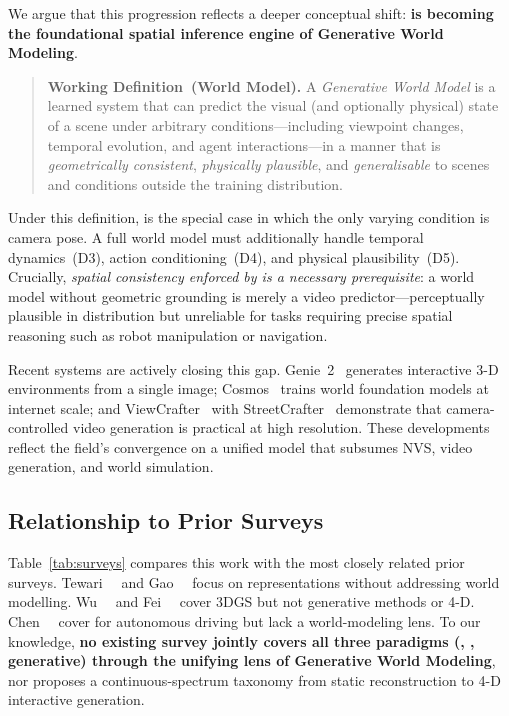 We argue that this progression reflects a deeper conceptual shift:
\textbf{\nvs{} is becoming the foundational spatial inference engine of
Generative World Modeling}.

\begin{quote}
  \textbf{Working Definition~(World Model).}\quad
  A \emph{Generative World Model} is a learned system that can predict the
  visual (and optionally physical) state of a scene under arbitrary
  conditions---including viewpoint changes, temporal evolution, and agent
  interactions---in a manner that is \emph{geometrically consistent},
  \emph{physically plausible}, and \emph{generalisable} to scenes and conditions
  outside the training distribution.
\end{quote}

Under this definition, \nvs{} is the special case in which the only varying
condition is camera pose.
A full world model must additionally handle temporal dynamics~(D3),
action conditioning~(D4), and physical plausibility~(D5).
Crucially, \emph{spatial consistency enforced by \nvs{} is a necessary
prerequisite}: a world model without geometric grounding is merely a video
predictor---perceptually plausible in distribution but unreliable for tasks
requiring precise spatial reasoning such as robot manipulation or navigation.

Recent systems are actively closing this gap.
Genie~2~\citep{parkerholder2024genie2} generates interactive 3-D environments
from a single image; Cosmos~\citep{agarwal2025cosmos} trains world foundation
models at internet scale; and ViewCrafter~\citep{yu2024viewcrafter} with
StreetCrafter~\citep{yan2024streetcrafter} demonstrate that camera-controlled
video generation is practical at high resolution.
These developments reflect the field's convergence on a unified model that
subsumes NVS, video generation, and world simulation.

\subsection{Relationship to Prior Surveys}

Table~\ref{tab:surveys} compares this work with the most closely related
prior surveys.
Tewari~\etal~\citep{tewari2022advances} and
Gao~\etal~\citep{gao2022nerf_survey} focus on \nerf{} representations
without addressing world modelling.
Wu~\etal~\citep{wu2024recentGS} and
Fei~\etal~\citep{fei2024gssurvey} cover 3DGS but not generative methods or 4-D.
Chen~\etal~\citep{chen2024survey_drivingNVS} cover \nvs{} for autonomous driving
but lack a world-modeling lens.
To our knowledge, \textbf{no existing survey jointly covers all three paradigms
(\nerf{}, \tgs{}, generative) through the unifying lens of Generative World
Modeling}, nor proposes a continuous-spectrum taxonomy from static
reconstruction to 4-D interactive generation.

